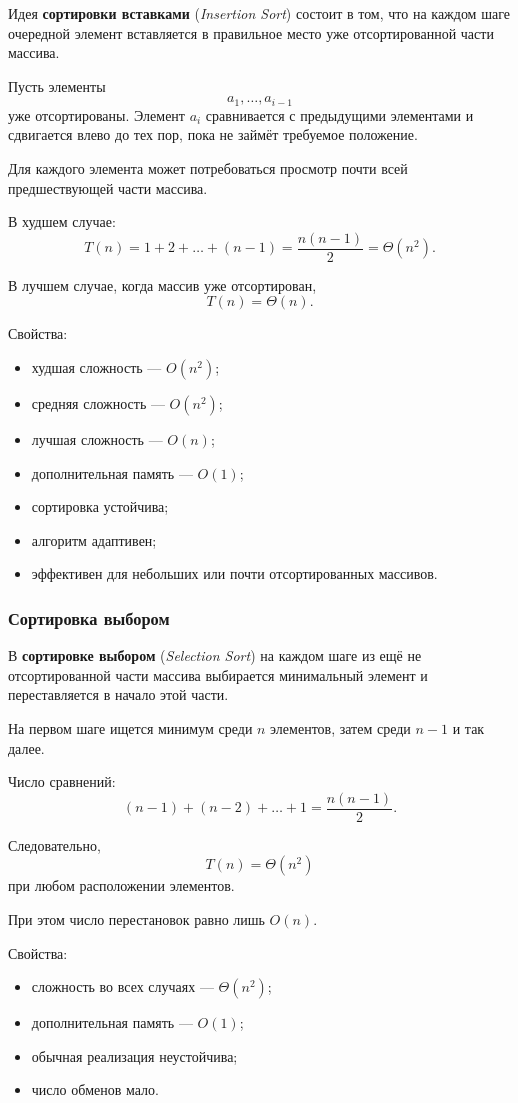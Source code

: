Идея \textbf{сортировки вставками} (\textit{Insertion Sort}) состоит в том,
что на каждом шаге очередной элемент вставляется в правильное место уже
отсортированной части массива.

Пусть элементы
\[
a_1,\ldots,a_{i-1}
\]
уже отсортированы. Элемент $a_i$ сравнивается с предыдущими элементами и
сдвигается влево до тех пор, пока не займёт требуемое положение.

Для каждого элемента может потребоваться просмотр почти всей
предшествующей части массива.

В худшем случае:
\[
T(n)=1+2+\ldots+(n-1)
=\frac{n(n-1)}{2}
=\Theta(n^2).
\]

В лучшем случае, когда массив уже отсортирован,
\[
T(n)=\Theta(n).
\]

Свойства:
\begin{itemize}
	\item худшая сложность --- $O(n^2)$;
	\item средняя сложность --- $O(n^2)$;
	\item лучшая сложность --- $O(n)$;
	\item дополнительная память --- $O(1)$;
	\item сортировка устойчива;
	\item алгоритм адаптивен;
	\item эффективен для небольших или почти отсортированных массивов.
\end{itemize}


\subsubsection*{Сортировка выбором}

В \textbf{сортировке выбором} (\textit{Selection Sort}) на каждом шаге
из ещё не отсортированной части массива выбирается минимальный элемент и
переставляется в начало этой части.

На первом шаге ищется минимум среди $n$ элементов, затем среди $n-1$ и так
далее.

Число сравнений:
\[
(n-1)+(n-2)+\ldots+1
=\frac{n(n-1)}{2}.
\]

Следовательно,
\[
T(n)=\Theta(n^2)
\]
при любом расположении элементов.

При этом число перестановок равно лишь $O(n)$.

Свойства:
\begin{itemize}
	\item сложность во всех случаях --- $\Theta(n^2)$;
	\item дополнительная память --- $O(1)$;
	\item обычная реализация неустойчива;
	\item число обменов мало.
\end{itemize}

